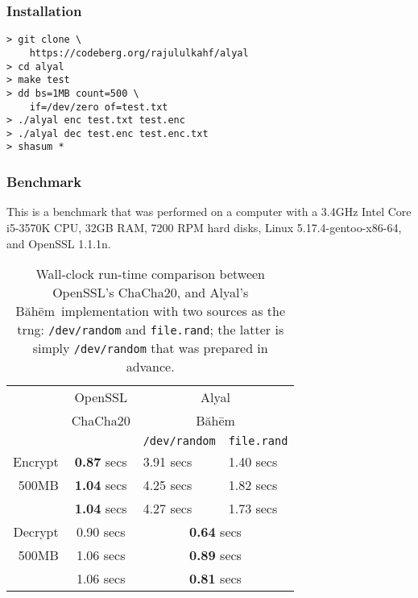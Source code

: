 \documentclass[twocolumn,hidelinks]{article}
\newcommand{\baheem}{Băhēm}
\newcommand{\alyal}{Alyal}
\begin{document}
\subsubsection{Installation}
\begin{verbatim}
> git clone \
    https://codeberg.org/rajululkahf/alyal
> cd alyal
> make test
> dd bs=1MB count=500 \
    if=/dev/zero of=test.txt
> ./alyal enc test.txt test.enc
> ./alyal dec test.enc test.enc.txt
> shasum *
\end{verbatim}

\subsubsection{Benchmark}
This is a benchmark that was performed on a computer with a 3.4GHz Intel
Core i5-3570K CPU, 32GB RAM, 7200 RPM hard disks, Linux
5.17.4-gentoo-x86-64, and OpenSSL 1.1.1n.

\begin{table}[tbh]
    \centering
    \begin{tabular}{rcll}
                & OpenSSL            & \multicolumn{2}{c}{\alyal}                \\
                & ChaCha20           & \multicolumn{2}{c}{\baheem}               \\
                &                    & \texttt{/dev/random} & \texttt{file.rand} \\\hline
        Encrypt & \textbf{0.87} secs & 3.91 secs            & 1.40 secs          \\
        500MB   & \textbf{1.04} secs & 4.25 secs            & 1.82 secs          \\
                & \textbf{1.04} secs & 4.27 secs            & 1.73 secs          \\\hline
        Decrypt & 0.90 secs          & \multicolumn{2}{c}{\textbf{0.64} secs}    \\
        500MB   & 1.06 secs          & \multicolumn{2}{c}{\textbf{0.89} secs}    \\
                & 1.06 secs          & \multicolumn{2}{c}{\textbf{0.81} secs}    \\
    \end{tabular}
    \caption{Wall-clock run-time comparison between OpenSSL's ChaCha20, and
    \alyal's \baheem\ implementation with two sources as the \gls{trng}:
    \texttt{/dev/random} and \texttt{file.rand};  the latter is simply
    \texttt{/dev/random} that was prepared in advance.}
    \label{tbl_benchmark}
\end{table}
\end{document}
